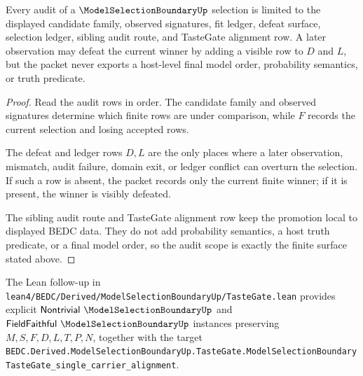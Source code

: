 \begin{theorem}
\label{thm:modelselectionboundary-audit-scope}
Every audit of a $\ModelSelectionBoundaryUp$ selection is limited to the displayed candidate family, observed signatures, fit ledger, defeat surface, selection ledger, sibling audit route, and TasteGate alignment row. A later observation may defeat the current winner by adding a visible row to $D$ and $L$, but the packet never exports a host-level final model order, probability semantics, or truth predicate.
\end{theorem}
\begin{proof}
Read the audit rows in order. The candidate family and observed signatures determine which finite rows are under comparison, while $F$ records the current selection and losing accepted rows.

The defeat and ledger rows $D,L$ are the only places where a later observation, mismatch, audit failure, domain exit, or ledger conflict can overturn the selection. If such a row is absent, the packet records only the current finite winner; if it is present, the winner is visibly defeated.

The sibling audit route and TasteGate alignment row keep the promotion local to displayed BEDC data. They do not add probability semantics, a host truth predicate, or a final model order, so the audit scope is exactly the finite surface stated above.
\end{proof}



The Lean follow-up in \texttt{lean4/BEDC/Derived/ModelSelectionBoundaryUp/TasteGate.lean} provides explicit $\mathsf{Nontrivial}\ \ModelSelectionBoundaryUp$ and $\mathsf{FieldFaithful}\ \ModelSelectionBoundaryUp$ instances preserving $M,S,F,D,L,T,P,N$, together with the target \texttt{BEDC.Derived.ModelSelectionBoundaryUp.TasteGate.ModelSelectionBoundaryTasteGate\_single\_carrier\_alignment}.

